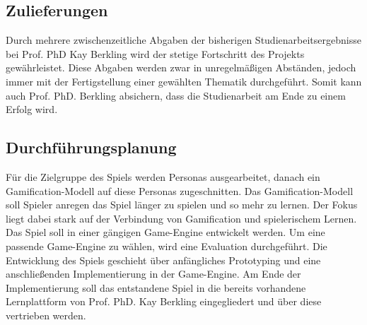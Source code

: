 \subsection{Zulieferungen}
Durch mehrere zwischenzeitliche Abgaben der bisherigen Studienarbeitsergebnisse bei Prof. PhD Kay Berkling wird der stetige Fortschritt des Projekts gewährleistet. Diese Abgaben werden zwar in unregelmäßigen Abständen, jedoch immer mit der Fertigstellung einer gewählten Thematik durchgeführt. Somit kann auch Prof. PhD. Berkling absichern, dass die Studienarbeit am Ende zu einem Erfolg wird.

\subsection{Durchführungsplanung}
Für die Zielgruppe des Spiels werden Personas ausgearbeitet, danach ein Gamification-Modell auf diese Personas zugeschnitten. Das Gamification-Modell soll Spieler anregen das Spiel länger zu spielen und so mehr zu lernen. Der Fokus liegt dabei stark auf der Verbindung von Gamification und spielerischem Lernen.
Das Spiel soll in einer gängigen Game-Engine entwickelt werden. Um eine passende Game-Engine zu wählen, wird eine Evaluation durchgeführt.
Die Entwicklung des Spiels geschieht über anfängliches Prototyping und eine anschließenden Implementierung in der Game-Engine. Am Ende der Implementierung soll das entstandene Spiel in die bereits vorhandene Lernplattform von Prof. PhD. Kay Berkling eingegliedert und über diese vertrieben werden.
\pagebreak